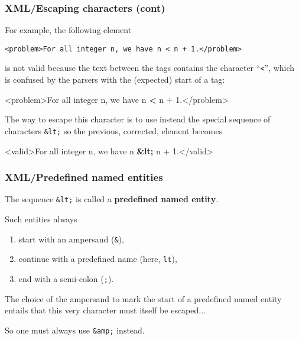 %
\begin{frame}[containsverbatim]
\frametitle{XML/Escaping characters (cont)}

For example, the following element
{\small
\begin{verbatim}
<problem>For all integer n, we have n < n + 1.</problem>
\end{verbatim}
}
is not valid because the text between the tags contains the character
``\texttt{<}'', which is confused by the \XML parsers with the (expected)
start of a tag:
{\small
\begin{semiverbatim}
<problem>For all integer n, we have n \textbf{<} n + 1.</problem>
\end{semiverbatim}
} 
The \XML way to escape this character is to use instead the special
sequence of characters \verb|&lt;| so the previous, corrected, element
becomes
{\small
\begin{semiverbatim}
<valid>For all integer n, we have n \textbf{&lt;} n + 1.</valid>
\end{semiverbatim}
}

\end{frame}

%
\begin{frame}[containsverbatim]
\frametitle{XML/Predefined named entities}

The sequence \verb|&lt;| is called a \textbf{predefined named entity}.

\bigskip

Such entities always 
\begin{enumerate}
 
  \item start with an ampersand (\verb|&|), 

  \item continue with a predefined name (here, \texttt{lt}),

  \item end with a semi-colon (\texttt{;}).

\end{enumerate}
The choice of the ampersand to mark the start of a predefined named
entity entails that this very character must itself be escaped...

\bigskip

So one must always use \verb|&amp;| instead.

\end{frame}

